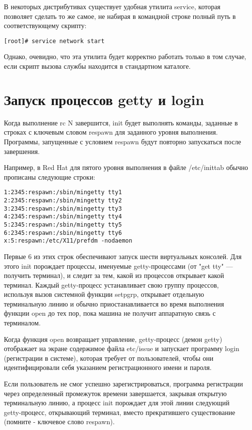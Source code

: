 В некоторых дистрибутивах существует удобная утилита service, которая позволяет сделать то же самое, не набирая в командной строке полный путь в соответствующему скрипту:

\begin{Verbatim}[frame=single]
[root]# service network start
\end{Verbatim}

Однако, очевидно, что эта утилита будет корректно работать только в том случае, если скрипт вызова службы находится в стандартном каталоге.

\newpage
\section{Запуск процессов getty и login}

Когда выполнение rc N завершится, init будет выполнять команды, заданные в строках с ключевым словом respawn для заданного уровня выполнения. Программы, запущенные с условием respawn будут повторно запускаться после завершения.

Например, в Red Hat для пятого уровня выполнения в файле /etc/inittab обычно прописаны следующие строки:

\begin{Verbatim}[frame=single]
1:2345:respawn:/sbin/mingetty tty1
2:2345:respawn:/sbin/mingetty tty2
3:2345:respawn:/sbin/mingetty tty3
4:2345:respawn:/sbin/mingetty tty4
5:2345:respawn:/sbin/mingetty tty5
6:2345:respawn:/sbin/mingetty tty6
x:5:respawn:/etc/X11/prefdm -nodaemon
\end{Verbatim}

Первые 6 из этих строк обеспечивают запуск шести виртуальных консолей. Для этого init порождает процессы, именуемые getty-процессами (от "get tty" — получить терминал), и следит за тем, какой из процессов открывает какой терминал. Каждый getty-процесс устанавливает свою группу процессов, используя вызов системной функции setpgrp, открывает отдельную терминальную линию и обычно приостанавливается во время выполнения функции open до тех пор, пока машина не получит аппаратную связь с терминалом.

Когда функция open возвращает управление, getty-процесс (демон getty) отображает на экране содержимое файла etc/issue и запускает программу login (регистрации в системе), которая требует от пользователей, чтобы они идентифицировали себя указанием регистрационного имени и пароля.

Если пользователь не смог успешно зарегистрироваться, программа регистрации через определенный промежуток времени завершается, закрывая открытую терминальную линию, а процесс init порождает для этой линии следующий getty-процесс, открывающий терминал, вместо прекратившего существование (помните - ключевое слово respawn).

